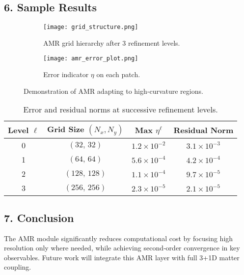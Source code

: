 \documentclass[12pt]{article}
\begin{document}
\subsection*{6. Sample Results}
\begin{figure}[h]
  \centering
  \begin{subfigure}[b]{0.45\textwidth}
    \texttt{[image: grid\_structure.png]}
    \caption{AMR grid hierarchy after 3 refinement levels.}
  \end{subfigure}
  \quad
  \begin{subfigure}[b]{0.45\textwidth}
    \texttt{[image: amr\_error\_plot.png]}
    \caption{Error indicator $\eta$ on each patch.}
  \end{subfigure}
  \caption{Demonstration of AMR adapting to high‐curvature regions.}
\end{figure}
\begin{table}[h]
  \centering
  \begin{tabular}{c c c c}
    \hline
    Level $\ell$ & Grid Size $(N_x,N_y)$ & Max $\eta^\ell$ & Residual Norm \\
    \hline
    0 & $(32,\,32)$ & $1.2\times10^{-2}$ & $3.1\times10^{-3}$ \\
    1 & $(64,\,64)$ & $5.6\times10^{-4}$ & $4.2\times10^{-4}$ \\
    2 & $(128,\,128)$ & $1.1\times10^{-4}$ & $9.7\times10^{-5}$ \\
    3 & $(256,\,256)$ & $2.3\times10^{-5}$ & $2.1\times10^{-5}$ \\
    \hline
  \end{tabular}
  \caption{Error and residual norms at successive refinement levels.}
\end{table}

\subsection*{7. Conclusion}
The AMR module significantly reduces computational cost by focusing high resolution only where needed, while achieving second‐order convergence in key observables.  Future work will integrate this AMR layer with full 3+1D matter coupling.
\end{document}
